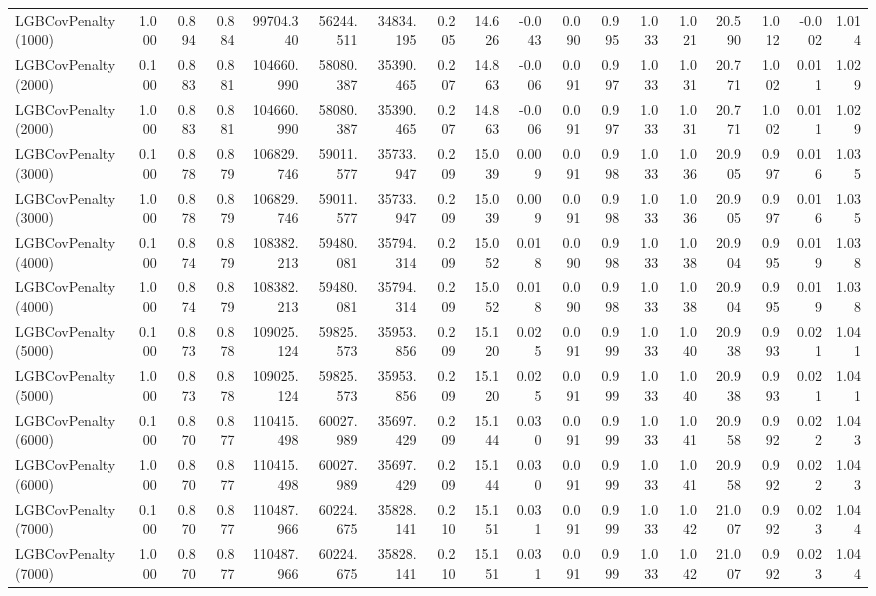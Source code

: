 \documentclass[11pt]{article}
\theoremstyle{plain}
\theoremstyle{definition}
\newcommand{\1}{\mathbf{1}}
\begin{document}
\begin{table}[htbp]
{\begin{tabular}{lrrrrrrrrrrrrrrrrr}
LGBCovPenalty(1000) & 1.000 & 0.894 & 0.884 & 99704.340 & 56244.511 & 34834.195 & 0.205 & 14.626 & -0.043 & 0.090 & 0.995 & 1.033 & 1.021 & 20.590 & 1.012 & -0.002 & 1.014 \\
LGBCovPenalty(2000) & 0.100 & 0.883 & 0.881 & 104660.990 & 58080.387 & 35390.465 & 0.207 & 14.863 & -0.006 & 0.091 & 0.997 & 1.033 & 1.031 & 20.771 & 1.002 & 0.011 & 1.029 \\
LGBCovPenalty(2000) & 1.000 & 0.883 & 0.881 & 104660.990 & 58080.387 & 35390.465 & 0.207 & 14.863 & -0.006 & 0.091 & 0.997 & 1.033 & 1.031 & 20.771 & 1.002 & 0.011 & 1.029 \\
LGBCovPenalty(3000) & 0.100 & 0.878 & 0.879 & 106829.746 & 59011.577 & 35733.947 & 0.209 & 15.039 & 0.009 & 0.091 & 0.998 & 1.033 & 1.036 & 20.905 & 0.997 & 0.016 & 1.035 \\
LGBCovPenalty(3000) & 1.000 & 0.878 & 0.879 & 106829.746 & 59011.577 & 35733.947 & 0.209 & 15.039 & 0.009 & 0.091 & 0.998 & 1.033 & 1.036 & 20.905 & 0.997 & 0.016 & 1.035 \\
LGBCovPenalty(4000) & 0.100 & 0.874 & 0.879 & 108382.213 & 59480.081 & 35794.314 & 0.209 & 15.052 & 0.018 & 0.090 & 0.998 & 1.033 & 1.038 & 20.904 & 0.995 & 0.019 & 1.038 \\
LGBCovPenalty(4000) & 1.000 & 0.874 & 0.879 & 108382.213 & 59480.081 & 35794.314 & 0.209 & 15.052 & 0.018 & 0.090 & 0.998 & 1.033 & 1.038 & 20.904 & 0.995 & 0.019 & 1.038 \\
LGBCovPenalty(5000) & 0.100 & 0.873 & 0.878 & 109025.124 & 59825.573 & 35953.856 & 0.209 & 15.120 & 0.025 & 0.091 & 0.999 & 1.033 & 1.040 & 20.938 & 0.993 & 0.021 & 1.041 \\
LGBCovPenalty(5000) & 1.000 & 0.873 & 0.878 & 109025.124 & 59825.573 & 35953.856 & 0.209 & 15.120 & 0.025 & 0.091 & 0.999 & 1.033 & 1.040 & 20.938 & 0.993 & 0.021 & 1.041 \\
LGBCovPenalty(6000) & 0.100 & 0.870 & 0.877 & 110415.498 & 60027.989 & 35697.429 & 0.209 & 15.144 & 0.030 & 0.091 & 0.999 & 1.033 & 1.041 & 20.958 & 0.992 & 0.022 & 1.043 \\
LGBCovPenalty(6000) & 1.000 & 0.870 & 0.877 & 110415.498 & 60027.989 & 35697.429 & 0.209 & 15.144 & 0.030 & 0.091 & 0.999 & 1.033 & 1.041 & 20.958 & 0.992 & 0.022 & 1.043 \\
LGBCovPenalty(7000) & 0.100 & 0.870 & 0.877 & 110487.966 & 60224.675 & 35828.141 & 0.210 & 15.151 & 0.031 & 0.091 & 0.999 & 1.033 & 1.042 & 21.007 & 0.992 & 0.023 & 1.044 \\
LGBCovPenalty(7000) & 1.000 & 0.870 & 0.877 & 110487.966 & 60224.675 & 35828.141 & 0.210 & 15.151 & 0.031 & 0.091 & 0.999 & 1.033 & 1.042 & 21.007 & 0.992 & 0.023 & 1.044 \\

\end{tabular}}
\end{table}
\end{document}
